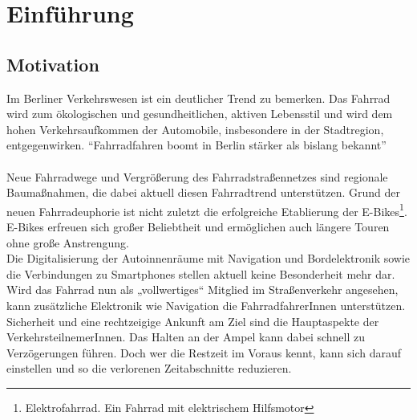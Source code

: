 \chapter{Einführung}
\section{Motivation}
Im Berliner Verkehrswesen ist ein deutlicher Trend zu bemerken. Das Fahrrad wird zum ökologischen und gesundheitlichen, aktiven Lebensstil und wird dem hohen Verkehrsaufkommen der Automobile, insbesondere in der Stadtregion, entgegenwirken. “Fahrradfahren boomt in Berlin stärker als bislang bekannt”\cite{Mopo}\\\\
Neue Fahrradwege und Vergrößerung des Fahrradstraßennetzes sind regionale Baumaßnahmen, die dabei aktuell diesen Fahrradtrend unterstützen. Grund der neuen Fahrradeuphorie ist nicht zuletzt die erfolgreiche Etablierung der E-Bikes\footnote{ Elektrofahrrad. Ein Fahrrad mit elektrischem Hilfsmotor}. E-Bikes erfreuen sich großer Beliebtheit und ermöglichen auch längere Touren ohne große Anstrengung.\\ 
Die Digitalisierung der Autoinnenräume mit Navigation und Bordelektronik sowie die Verbindungen zu \glspl{Smartphone} stellen aktuell keine Besonderheit mehr dar. Wird das Fahrrad nun als „vollwertiges“ Mitglied im Straßenverkehr angesehen, kann zusätzliche Elektronik wie Navigation die FahrradfahrerInnen unterstützen.\\
Sicherheit und eine rechtzeigige Ankunft am Ziel sind die Hauptaspekte der VerkehrsteilnemerInnen. Das Halten an der Ampel kann dabei schnell zu Verzögerungen führen. Doch wer die Restzeit im Voraus kennt, kann sich darauf einstellen und so die verlorenen Zeitabschnitte reduzieren.
